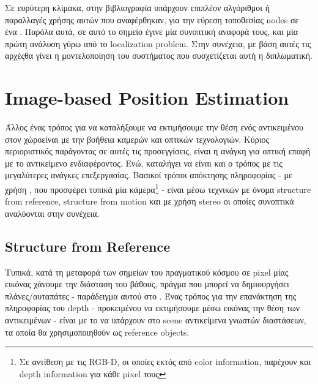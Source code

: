 
Σε ευρύτερη κλίμακα, στην βιβλιογραφία υπάρχουν επιπλέον αλγόριθμοι ή παραλλαγές χρήσης αυτών που αναφέρθηκαν, για την εύρεση τοποθεσίας
nodes σε ένα . Παρόλα αυτά, σε αυτό το σημείο έγινε μία συνοπτική αναφορά τους,  και μία πρώτη
ανάλυση γύρω από το localization problem. Στην συνέχεια,
με βάση αυτές τις αρχές\udot θα γίνει η μοντελοποίηση του συστήματος που συσχετίζεται αυτή η διπλωματική. 

\newpage
\section{Image-based Position Estimation} \label{chap:Image-based}
Άλλος ένας τρόπος για να καταλήξουμε να εκτιμήσουμε την θέση ενός αντικειμένου στον χώρο\udot είναι με την βοήθεια καμερών και οπτικών τεχνολογιών. Κύριος πε\-ριο\-ρι\-στι\-κός παράγοντας σε αυτές τις προσεγγίσεις, είναι η ανάγκη για οπτική επαφή με το αντικείμενο ενδιαφέροντος. Ενώ, καταλήγει να είναι και ο τρόπος με τις μεγαλύτερες ανάγκες επεξεργασίας. Βασικοί τρόποι απόκτησης  πληροφορίας - με χρήση , που προσφέρει τυπικά μία κάμερα\footnote{Σε αντίθεση με τις RGB-D, οι οποίες εκτός από color information, παρέχουν και depth information για κάθε pixel τους} - είναι μέσω τεχνικών με όνομα structure from reference, structure from motion και με χρήση stereo \cite{location-from-image} οι οποίες συνοπτικά αναλύονται στην συνέχεια.

\subsection{Structure from Reference} \label{sec:theo-structure-from-reference}
Τυπικά, κατά τη μεταφορά των σημείων του πραγματικού κόσμου  σε pixel μίας εικόνας  χάνουμε την διάσταση του βάθους, πράγμα που μπορεί να δημιουργήσει πλάνες/αυταπάτες - παράδειγμα αυτού στο . Ένας τρόπος για την επανάκτηση της πληροφορίας του depth - προκειμένου να εκτιμήσουμε μέσω εικόνας την θέση των αντικειμένων - είναι με το να υπάρχουν στο scene αντικείμενα γνωστών διαστάσεων, τα οποία θα χρησιμοποιηθούν ως reference objects.

